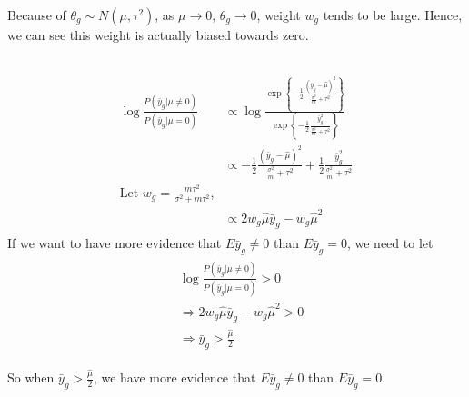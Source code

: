 \documentclass[paper=letter, fontsize=11pt]{scrartcl} %
\numberwithin{equation}{section} %
\numberwithin{figure}{section} %
\numberwithin{table}{section} %
\begin{document}
Because of $\theta_g \sim N(\mu, \tau^2)$, as $\mu \rightarrow 0$, $\theta_g \rightarrow 0$, weight $w_g$ tends to be large. Hence, we can see this weight is actually biased towards zero. 

\subsection*{}
\begin{align*}
\begin{split}
\log\frac{P(\bar{y}_g|\mu\ne0)}{P(\bar{y}_g|\mu = 0)} &\propto \log  \frac{\exp\left\{-\frac{1}{2}\frac{(\bar{y}_g-\hat{\mu})^2}{\frac{\sigma^2}{m}+\tau^2}\right\}}{\exp\left\{-\frac{1}{2}\frac{\bar{y}_g^2}{\frac{\sigma^2}{m}+\tau^2}\right\}} \\
&\propto -\frac{1}{2}\frac{(\bar{y}_g-\hat{\mu})^2}{\frac{\sigma^2}{m}+\tau^2} + \frac{1}{2}\frac{\bar{y}_g^2}{\frac{\sigma^2}{m}+\tau^2} \\
\text{Let $w_g = \frac{m\tau^2}{\sigma^2+m\tau^2}$,} &\\
&\propto 2w_g\hat{\mu}\bar{y}_g - w_g\hat{\mu}^2
\end{split}
\end{align*}
If we want to have more evidence that $E\bar{y}_g \ne 0$ than $E\bar{y}_g = 0$, we need to let
\begin{align*}
\begin{split}
&\log\frac{P(\bar{y}_g|\mu\ne0)}{P(\bar{y}_g|\mu = 0)} > 0 \\
& \Longrightarrow 2w_g\hat{\mu}\bar{y}_g - w_g\hat{\mu}^2 >0 \\
& \Longrightarrow \bar{y}_g> \frac{\hat{\mu}}{2}
\end{split}
\end{align*}

So when $\bar{y}_g> \frac{\hat{\mu}}{2}$, we have more evidence that $E\bar{y}_g \ne 0$ than $E\bar{y}_g = 0$.
\end{document}
